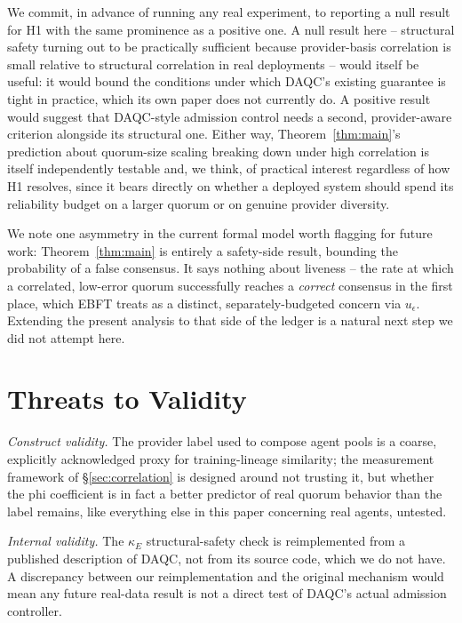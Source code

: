 \documentclass[journal]{IEEEtran}
\begin{document}
We commit, in advance of running any real experiment, to reporting a null result for H1 with the same prominence as a positive one. A null result here -- structural safety turning out to be practically sufficient because provider-basis correlation is small relative to structural correlation in real deployments -- would itself be useful: it would bound the conditions under which DAQC's existing guarantee is tight in practice, which its own paper does not currently do. A positive result would suggest that DAQC-style admission control needs a second, provider-aware criterion alongside its structural one. Either way, Theorem~\ref{thm:main}'s prediction about quorum-size scaling breaking down under high correlation is itself independently testable and, we think, of practical interest regardless of how H1 resolves, since it bears directly on whether a deployed system should spend its reliability budget on a larger quorum or on genuine provider diversity.

We note one asymmetry in the current formal model worth flagging for future work: Theorem~\ref{thm:main} is entirely a safety-side result, bounding the probability of a false consensus. It says nothing about liveness -- the rate at which a correlated, low-error quorum successfully reaches a \emph{correct} consensus in the first place, which EBFT treats as a distinct, separately-budgeted concern via $u_\epsilon$. Extending the present analysis to that side of the ledger is a natural next step we did not attempt here.

\section{Threats to Validity}
\label{sec:threats}

\emph{Construct validity.} The provider label used to compose agent pools is a coarse, explicitly acknowledged proxy for training-lineage similarity; the measurement framework of \S\ref{sec:correlation} is designed around not trusting it, but whether the phi coefficient is in fact a better predictor of real quorum behavior than the label remains, like everything else in this paper concerning real agents, untested.

\emph{Internal validity.} The $\kappa_E$ structural-safety check is reimplemented from a published description of DAQC, not from its source code, which we do not have. A discrepancy between our reimplementation and the original mechanism would mean any future real-data result is not a direct test of DAQC's actual admission controller.
\end{document}
